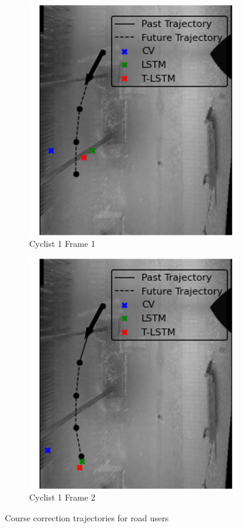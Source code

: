 \documentclass{article}
\begin{document}
\begin{figure}[H]
\begin{subfigure}{0.40\textwidth}
  \includegraphics[width=\linewidth]{quali_results/first-1.png}
  \caption{Cyclist 1 Frame 1}
  \label{fig:cyc1-1}
\end{subfigure}
\begin{subfigure}{0.40\textwidth}
  \centering
  \includegraphics[width=\linewidth]{quali_results/first-2.png}
  \caption{Cyclist 1 Frame 2}
  \label{fig:cyc1-2}
\end{subfigure}
\caption{Course correction trajectories for road users }
\label{fig:cyc1&2}
\end{figure}
\end{document}
